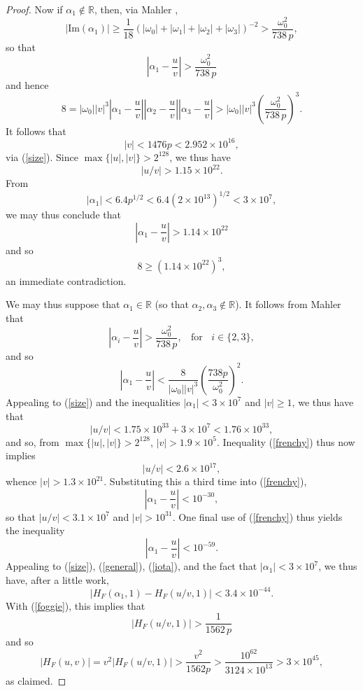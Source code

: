 \begin{proof}
Now if $\alpha_1 \not\in \mathbb{R}$, then, via Mahler \cite{Mah},
$$
\left| \mbox{Im} (\alpha_1) \right|  \geq \frac{1}{18} \left( |\omega_0|+|\omega_1|+|\omega_2|+|\omega_3| \right)^{-2} > \frac{\omega_0^2}{738 \, p},
$$
so that
$$
\left| \alpha_1 - \frac{u}{v} \right|> \frac{\omega_0^2}{738 \, p}
$$
and hence
$$
8 = |\omega_0| |v|^3 \left| \alpha_1 - \frac{u}{v} \right| \left| \alpha_2 - \frac{u}{v} \right| \left| \alpha_3 - \frac{u}{v} \right| > |\omega_0| |v|^3 \left( \frac{\omega_0^2}{738 \, p} \right)^3.
$$
It follows that
$$
|v| < 1476 p < 2.952 \times 10^{16},
$$
via (\ref{size}). Since $\max \{ |u|, |v| \} > 2^{128}$, we thus have
$$
\left| u/v \right| > 1.15 \times 10^{22}.
$$
From
$$
|\alpha_1| < 6.4 p^{1/2} < 6.4 \left( 2 \times 10^{13} \right)^{1/2} <3 \times 10^7, 
$$
we may thus conclude that
$$
\left| \alpha_1 - \frac{u}{v} \right|> 1.14 \times 10^{22}
$$
and so
$$
8 \geq \left( 1.14 \times 10^{22} \right)^3,
$$
an immediate contradiction.

We may thus suppose that $\alpha_1 \in \mathbb{R}$ (so that $\alpha_2, \alpha_3 \not\in \mathbb{R}$).  It follows from Mahler \cite{Mah} that
$$
\left| \alpha_i - \frac{u}{v} \right|> \frac{\omega_0^2}{738 \, p}, \; \; \mbox{ for } \; \; i \in \{ 2, 3 \},
$$
and so
\begin{equation} \label{frenchy}
\left| \alpha_1 - \frac{u}{v} \right| < \frac{8}{|\omega_0| |v|^3} \left( \frac{738 p }{\omega_0^2} \right)^2.
\end{equation}
Appealing to (\ref{size}) and the inequalities $|\alpha_1| < 3 \times 10^7$ and $|v| \geq 1$, we thus have that
$$
|u/v| <1.75 \times 10^{33} + 3 \times 10^7 < 1.76 \times 10^{33},
$$
and so, from $\max \{ |u|, |v| \} > 2^{128}$, $|v| > 1.9 \times 10^5$. Inequality (\ref{frenchy}) thus now implies 
$$
|u/v| < 2.6 \times 10^{17},
$$
whence $|v| > 1.3 \times 10^{21}$. Substituting this a third time into (\ref{frenchy}), 
$$
\left| \alpha_1 - \frac{u}{v} \right| <10^{-30},
$$
so that $|u/v| < 3.1 \times 10^7$ and $|v| > 10^{31}$. One final use of (\ref{frenchy}) thus yields the inequality
$$
\left| \alpha_1 - \frac{u}{v} \right| <10^{-59}.
$$
Appealing to (\ref{size}), (\ref{general}), (\ref{iota}), and the fact that $|\alpha_1| < 3 \times 10^7$, we thus have, after a little work,
$$
\left| H_F (\alpha_1,1) - H_F (u/v,1) \right| < 3.4 \times 10^{-44}.
$$
With (\ref{foggie}), this implies that
$$
\left|  H_F (u/v,1)  \right| > \frac{1}{1562 \, p}
$$
and so
$$
|H_F(u,v)| = v^2 \left| H_F(u/v,1) \right| > \frac{v^2 }{1562 p} > \frac{10^{62}}{3124 \times 10^{13}} > 3 \times 10^{45},
$$
as claimed.
\end{proof}


